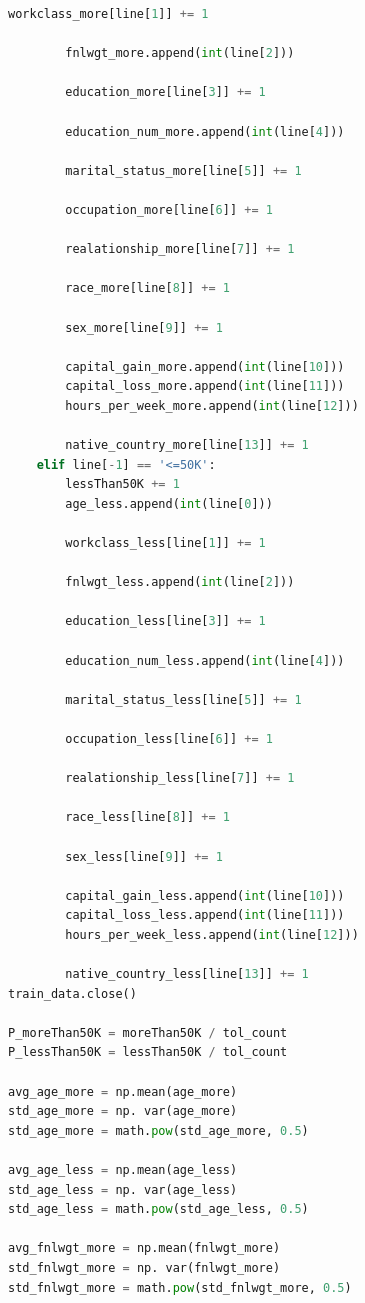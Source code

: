 ﻿\documentclass[a4paper, 11pt]{article}
\begin{document}
\begin{lstlisting}[language=Python,frame=single]
        workclass_more[line[1]] += 1

        fnlwgt_more.append(int(line[2]))

        education_more[line[3]] += 1

        education_num_more.append(int(line[4]))

        marital_status_more[line[5]] += 1

        occupation_more[line[6]] += 1

        realationship_more[line[7]] += 1

        race_more[line[8]] += 1

        sex_more[line[9]] += 1

        capital_gain_more.append(int(line[10]))
        capital_loss_more.append(int(line[11]))
        hours_per_week_more.append(int(line[12]))

        native_country_more[line[13]] += 1
    elif line[-1] == '<=50K':
        lessThan50K += 1
        age_less.append(int(line[0]))

        workclass_less[line[1]] += 1

        fnlwgt_less.append(int(line[2]))

        education_less[line[3]] += 1

        education_num_less.append(int(line[4]))

        marital_status_less[line[5]] += 1

        occupation_less[line[6]] += 1

        realationship_less[line[7]] += 1

        race_less[line[8]] += 1

        sex_less[line[9]] += 1

        capital_gain_less.append(int(line[10]))
        capital_loss_less.append(int(line[11]))
        hours_per_week_less.append(int(line[12]))

        native_country_less[line[13]] += 1
train_data.close()

P_moreThan50K = moreThan50K / tol_count
P_lessThan50K = lessThan50K / tol_count

avg_age_more = np.mean(age_more)
std_age_more = np. var(age_more)
std_age_more = math.pow(std_age_more, 0.5)

avg_age_less = np.mean(age_less)
std_age_less = np. var(age_less)
std_age_less = math.pow(std_age_less, 0.5)

avg_fnlwgt_more = np.mean(fnlwgt_more)
std_fnlwgt_more = np. var(fnlwgt_more)
std_fnlwgt_more = math.pow(std_fnlwgt_more, 0.5)


\end{lstlisting}
\end{document}
